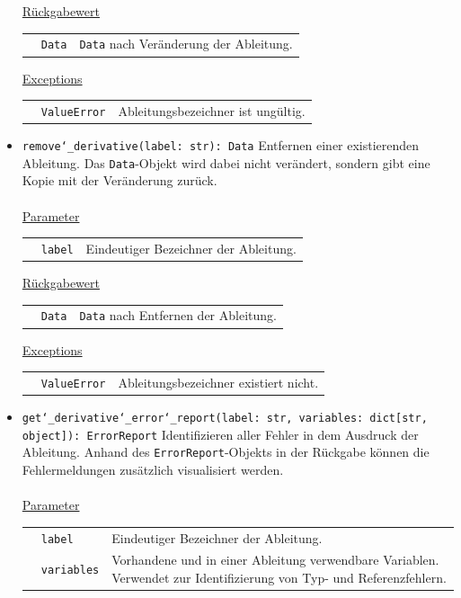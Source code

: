 \documentclass{article}
\begin{document}
\begin{itemize}
\underline{{Rückgabewert}}

\begin{tabular}{lll}
 & \texttt{Data} & \texttt{Data} nach Veränderung der Ableitung. \\
\end{tabular}

\underline{Exceptions}\\
\begin{tabular}{lll}
 & \texttt{ValueError} & Ableitungsbezeichner ist ungültig.\\
\end{tabular}


\item \texttt{remove\char`_derivative(label: str): Data} \newline Entfernen einer existierenden Ableitung. Das \texttt{Data}-Objekt wird dabei nicht verändert, sondern gibt eine Kopie mit der Veränderung zurück.
\\\\
\underline{{Parameter}}

\begin{tabular}{lll}
 & \texttt{label} & Eindeutiger Bezeichner der Ableitung. \\
\end{tabular}

\underline{{Rückgabewert}}

\begin{tabular}{lll}
 & \texttt{Data} & \texttt{Data} nach Entfernen der Ableitung. \\
\end{tabular}

\underline{Exceptions}\\
\begin{tabular}{lll}
 & \texttt{ValueError} & Ableitungsbezeichner existiert nicht.\\
\end{tabular}

\item \texttt{get\char`_derivative\char`_error\char`_report(label: str, variables: dict[str, object]): ErrorReport} \newline Identifizieren aller Fehler in dem Ausdruck der Ableitung. Anhand des \texttt{ErrorReport}-Objekts in der Rückgabe können die Fehlermeldungen zusätzlich visualisiert werden.
\\\\
\underline{{Parameter}}

\begin{tabular}{lll}
 & \texttt{label} & Eindeutiger Bezeichner der Ableitung. \\
 & \texttt{variables} & Vorhandene und in einer Ableitung verwendbare Variablen. Verwendet zur Identifizierung von Typ- und Referenzfehlern. \\
\end{tabular}


\end{itemize}
\end{document}
